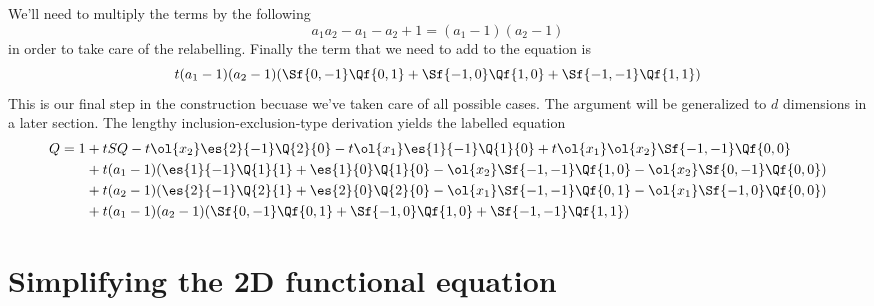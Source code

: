 We'll need to multiply the terms by the following
\[
	 a_1a_2-a_1-a_2+1 = (a_1-1)(a_2-1)
\]
in order to take care of the relabelling. Finally the term that we need to add to the equation is
\[
	t(a_1-1)(a_2-1)(\Sf{0,-1}\Qf{0,1}+\Sf{-1,0}\Qf{1,0}+\Sf{-1,-1}\Qf{1,1}) 
\]
This is our final step in the construction becuase we've taken care of all possible cases. The argument will be generalized to $d$ dimensions in a later section. The lengthy inclusion-exclusion-type derivation yields the labelled equation
\begin{align*}
Q = 1 &+ tSQ - t \ol{x_2}\es{2}{-1}\Q{2}{0} - t\ol{x_1}\es{1}{-1}\Q{1}{0}+t\ol{x_1}\ol{x_2}\Sf{-1,-1}\Qf{0,0}\\
	&+ t(a_1-1)(\es{1}{-1}\Q{1}{1}+\es{1}{0}\Q{1}{0}-\ol{x_2}\Sf{-1,-1}\Qf{1,0}-\ol{x_2}\Sf{0,-1}\Qf{0,0})\\
	&+ t(a_2-1)(\es{2}{-1}\Q{2}{1}+\es{2}{0}\Q{2}{0}-\ol{x_1}\Sf{-1,-1}\Qf{0,1}-\ol{x_1}\Sf{-1,0}\Qf{0,0})\\
	&+t(a_1-1)(a_2-1)(\Sf{0,-1}\Qf{0,1}+\Sf{-1,0}\Qf{1,0}+\Sf{-1,-1}\Qf{1,1})
\end{align*}

\section{Simplifying the 2D functional equation}


